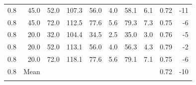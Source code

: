 \begin{table}
\begin{tabular}{rrrrrrrrrr}
0.8 & 45.0 & 52.0 & 107.3 & 56.0 & 4.0 & 58.1 & 6.1 & 0.72 & -11 \\
0.8 & 45.0 & 72.0 & 112.5 & 77.6 & 5.6 & 79.3 & 7.3 & 0.75 & -6 \\
0.8 & 20.0 & 32.0 & 104.4 & 34.5 & 2.5 & 35.0 & 3.0 & 0.76 & -5 \\
0.8 & 20.0 & 52.0 & 113.1 & 56.0 & 4.0 & 56.3 & 4.3 & 0.79 & -2 \\
0.8 & 20.0 & 72.0 & 118.1 & 77.6 & 5.6 & 79.1 & 7.1 & 0.75 & -6 \\
0.8 & Mean & & & & & & & 0.72 & -10 \\
\bottomhline
\end{tabular}
\end{table}
